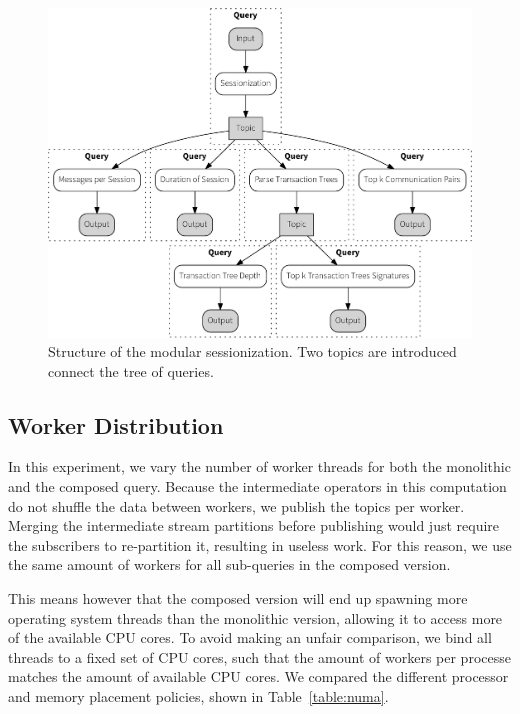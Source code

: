 \begin{figure}[p]
  \centering
    \includegraphics[width=1\textwidth]{figures/sessionize_split-crop}
  \caption[Dataflow graph for modular sessionization]{Structure of the modular
  sessionization. Two topics are introduced connect the tree of queries.}
  \label{fig:split}
\end{figure}

\subsection{Worker Distribution}

In this experiment, we vary the number of worker threads for both the monolithic
and the composed query. Because the intermediate operators in this computation
do not shuffle the data between workers, we publish the topics per worker. Merging
the intermediate stream partitions before publishing would just require the
subscribers to re-partition it, resulting in useless work. For this reason, we
use the same amount of workers for all sub-queries in the composed version.

This means however that the composed version will end up spawning more operating
system threads than the monolithic version, allowing it to access more of the
available CPU cores. To avoid making an unfair comparison, we bind all threads
to a fixed set of CPU cores, such that the amount of workers per processe
matches the amount of available CPU cores. We compared the different processor
and memory placement policies, shown in Table~\ref{table:numa}.  




